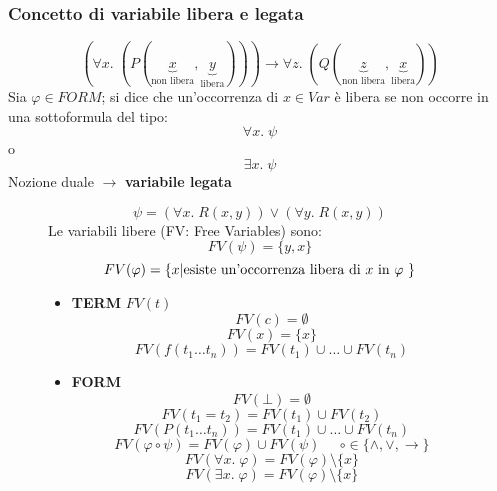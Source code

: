 \documentclass{article}
\theoremstyle{break}
\theoremstyle{break}
\theoremstyle{break}
\theoremstyle{break}
\begin{document}
\subsubsection{Concetto di variabile libera e legata}
\[
  (\forall x.\; (P(\underbrace{x}_{\text{non libera}},\underbrace{y}_{\text{libera}}))) \to \forall z.\; (Q(\underbrace{z}_{\text{non libera}},\underbrace{x}_{\text{libera}}))
\] 
Sia \( \varphi \in FORM \); si dice che un'occorrenza di \( x \in Var \) è libera se non occorre
in una sottoformula del tipo:
\[ \forall x.\; \psi \] o \[ \exists x.\; \psi \] 
Nozione duale \( \to  \) \textbf{variabile legata}
\begin{figure}[H]
  \begin{example}
    \[
      \psi = (\forall x.\; R(x,y)) \vee (\forall y.\; R(x,y))
    \] 
    Le variabili libere (FV: Free Variables) sono:
    \[
      FV(\psi) = \{y,x\}
    \] 
    \[
      FV(\varphi) = \{x | \text{esiste un'occorrenza libera di \( x \) in \( \varphi \) }\} 
    \] 
  \end{example}
\end{figure}

\begin{figure}[H]
  \begin{definition}
    \begin{itemize}
      \item \textbf{TERM} \( FV(t) \) 
        \[
          FV(c) = \emptyset
        \] 
        \[
          FV(x) = \{x\} 
        \] 
        \[
          FV(f(t_1 \ldots t_n)) = FV(t_1) \cup \ldots \cup FV(t_n)
        \] 
      \item \textbf{FORM}
        \[
          FV(\bot) = \emptyset
        \] 
        \[
          FV(t_1 = t_2) = FV(t_1) \cup FV(t_2)
        \] 
        \[
          FV(P(t_1 \ldots t_n)) = FV(t_1) \cup \ldots \cup FV(t_n)
        \] 
        \[
          FV(\varphi \circ \psi) = FV(\varphi) \cup FV(\psi) \;\;\;\;\; \circ \in \{\wedge, \vee, \to \}
        \] 
        \[
          FV(\forall x.\; \varphi) = FV(\varphi) \setminus \{x\}
        \] 
        \[
          FV(\exists x.\; \varphi) = FV(\varphi) \setminus \{x\}
        \] 
    \end{itemize} 
  \end{definition}
\end{figure}
\end{document}
